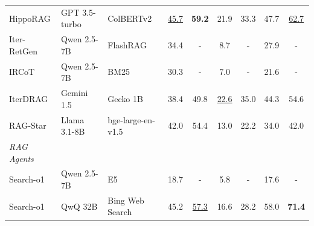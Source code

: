 \begin{table}[h!]
\begin{tabular}{lllcccccc}
HippoRAG                                    & GPT 3.5-turbo                                 & ColBERTv2                                      & \underline{45.7}                & \textbf{59.2}                   & 21.9                       & 33.3                       & 47.7                          & \underline{62.7}                      \\
Iter-RetGen                                 & Qwen 2.5-7B                                   & FlashRAG                                       & 34.4  & -                               & 8.7                        & -                          & 27.9                          & -                         \\
IRCoT                                       & Qwen 2.5-7B                                   & BM25                                           & 30.3  & -                               & 7.0                        & -                          & 21.6                          & -                         \\
IterDRAG                                    & Gemini 1.5                                    & Gecko 1B                                       & 38.4                & 49.8                            & \underline{22.6}                       & 35.0                       & 44.3                          & 54.6                      \\
RAG-Star                                    & Llama 3.1-8B                                    & bge-large-en-v1.5                                       & 42.0                & 54.4                            & 13.0                       & 22.2                       & 34.0                          & 42.0                      \\
\midrule
\textit{RAG Agents} & & & & & & & & \\
Search-o1                                   & Qwen 2.5-7B                                       & E5                                & 18.7                      & -                      & 5.8                       & -                       & 17.6                    & -             \\
Search-o1                                   & QwQ 32B                                       & Bing Web Search                                & 45.2                      & \underline{57.3}                      & 16.6                       & 28.2                       & 58.0                    & \textbf{71.4}             \\

\end{tabular}
\end{table}
